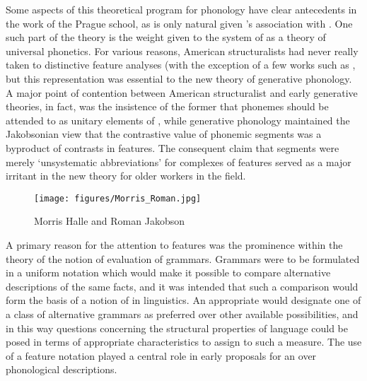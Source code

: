 \largerpage[-1]
Some aspects of this theoretical program for phonology have clear
antecedents in the work of the Prague school, as is only natural given
{\Halle}'s association with {\Jakobson}. One such part of the theory is the
weight given to the system of  as a theory of
universal phonetics. For various reasons, American structuralists had
never really taken to distinctive feature analyses (with the exception
of a few works such as \citealt{hockett55:manual}, but this
representation was essential to the new theory of generative
phonology. A major point of contention between American structuralist
and early generative theories, in fact, was the insistence of the
former that phonemes should be attended to as unitary elements of
, while generative phonology maintained the Jakobsonian view
that the contrastive value of phonemic segments was a byproduct of
contrasts in features. The consequent claim that segments were merely
`unsystematic abbreviations' for complexes of features served as a
major irritant in the new theory for older workers in the field.

\begin{wrapfigure}[13]{r}{.4\textwidth}
  \texttt{[image: figures/Morris\_Roman.jpg]}
  \caption{Morris Halle and Roman Jakobson}
  \label{fig:ch.genphon.morris-roman}
\end{wrapfigure}
A primary reason for the attention to features was the prominence
within the theory of the notion of evaluation of grammars. Grammars
were to be formulated in a uniform notation which would make it
possible to compare alternative descriptions of the same facts, and it
was intended that such a comparison would form the basis of a notion
of  in linguistics. An appropriate  would
designate one of a class of alternative grammars as preferred over
other available possibilities, and in this way questions concerning
the structural properties of language could be posed in terms of
appropriate characteristics to assign to such a measure. The use of a
feature notation played a central role in early proposals for an
 over phonological descriptions.

